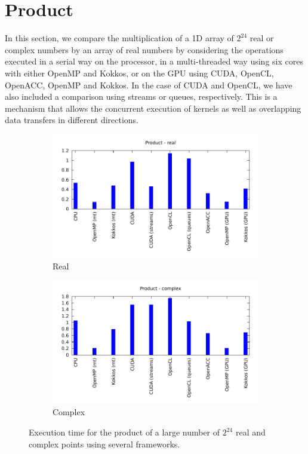 \documentclass[12pt, a4paper]{article}
\begin{document}
\section{Product}\label{PRODUCT}
In this section, we compare the multiplication of a 1D array of $2^{24}$ real or
complex numbers by an array of real numbers by considering the
operations executed in a serial way on the processor, in a
multi-threaded way using six cores with either OpenMP and Kokkos, or
on the GPU using CUDA, OpenCL, OpenACC, OpenMP and Kokkos. In the case
of CUDA and OpenCL, we have also included a comparison using streams or
queues, respectively. This is a mechanism that allows the concurrent execution of
kernels as well as overlapping data transfers in different directions.
\begin{figure}[htb]
\captionsetup{width=0.8\linewidth}
\centering
\begin{subfigure}{.5\textwidth}
\centering
\includegraphics[width=.9\linewidth]{graphs/product-r.pdf}
\caption{Real}
\label{PRODR}
\end{subfigure}%
\begin{subfigure}{.5\textwidth}
\centering
\includegraphics[width=.9\linewidth]{graphs/product-c.pdf}
\caption{Complex}
\label{PRODC}
\end{subfigure}
\caption{Execution time for the product of a large number of $2^{24}$ real and complex points using several frameworks.}
\label{1DFFTW}
\end{figure}
\end{document}
